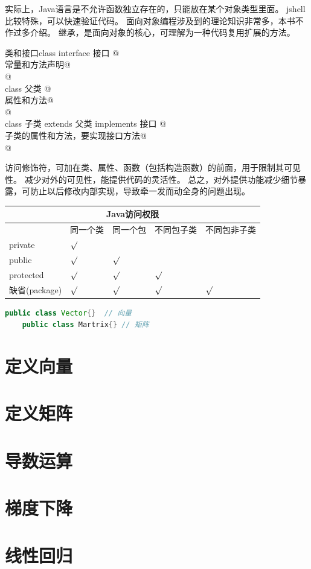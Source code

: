 实际上，Java语言是不允许函数独立存在的，只能放在某个对象类型里面。
jshell比较特殊，可以快速验证代码。
面向对象编程涉及到的理论知识非常多，本书不作过多介绍。
继承，是面向对象的核心，可理解为一种代码复用扩展的方法。

\begin{definition}{类和接口}{class}
	\lstinline@[修饰符] interface 接口 { @ \\
	\lstinline@	常量和方法声明@ \\
	\lstinline@}@ \\
	\lstinline@[修饰符] class 父类 { @ \\
	\lstinline@	属性和方法@ \\
	\lstinline@}@ \\
	\lstinline@[修饰符] class 子类 extends 父类 implements 接口 {@ \\
	\lstinline@	子类的属性和方法，要实现接口方法@ \\
	\lstinline@}@
\end{definition}

访问修饰符，可加在类、属性、函数（包括构造函数）的前面，用于限制其可见性。
减少对外的可见性，能提供代码的灵活性。
总之，对外提供功能减少细节暴露，可防止以后修改内部实现，导致牵一发而动全身的问题出现。

\begin{table}[!htbp]\centering
	\begin{tabular}{|p{3cm}|p{1.6cm}|p{1.6cm}|p{2cm}|p{2.4cm}|}
	\toprule
	\multicolumn{5}{|c|}{Java访问权限}\\ 
	\midrule
	&同一个类&同一个包&不同包子类&不同包非子类\\ \hline
	private&$\surd$&&&\\ \hline
	public&$\surd$&$\surd$&&\\\hline
	protected&$\surd$&$\surd$&$\surd$&\\ \hline
	缺省(package)&$\surd$&$\surd$&$\surd$&$\surd$\\
	\bottomrule
	\end{tabular}
\end{table}

\begin{lstlisting}[language=Java]
	public class Vector{}  // 向量
	public class Martrix{} // 矩阵
\end{lstlisting}

\section{定义向量}

\section{定义矩阵}

\section{导数运算}

\section{梯度下降}

\section{线性回归}
